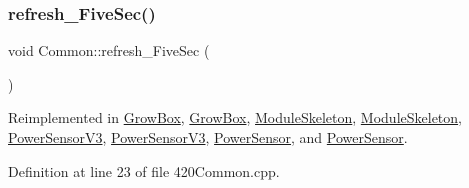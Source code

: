 \mbox{\label{class_common_a604ab36b3a1d9a5bcfcb225149c82f90}} 
\subsubsection{\texorpdfstring{refresh\+\_\+\+Five\+Sec()}{refresh\_FiveSec()}\hspace{0.1cm}{\footnotesize\ttfamily [1/2]}}
{\footnotesize\ttfamily void Common\+::refresh\+\_\+\+Five\+Sec (\begin{DoxyParamCaption}{ }\end{DoxyParamCaption})\hspace{0.3cm}{\ttfamily [virtual]}}



Reimplemented in \hyperlink{class_grow_box_ad3c74a1bbf508489f113215d1f4ae43f}{Grow\+Box}, \hyperlink{class_grow_box_ad3c74a1bbf508489f113215d1f4ae43f}{Grow\+Box}, \hyperlink{class_module_skeleton_a5c9845eec6ca7fbaac1521f4b021712a}{Module\+Skeleton}, \hyperlink{class_module_skeleton_a5c9845eec6ca7fbaac1521f4b021712a}{Module\+Skeleton}, \hyperlink{class_power_sensor_v3_a1bf23a2cfa924933a5e265dc3a337ec4}{Power\+Sensor\+V3}, \hyperlink{class_power_sensor_v3_a1bf23a2cfa924933a5e265dc3a337ec4}{Power\+Sensor\+V3}, \hyperlink{class_power_sensor_a429859d5aa4b72bac2002cda95ac5b21}{Power\+Sensor}, and \hyperlink{class_power_sensor_a429859d5aa4b72bac2002cda95ac5b21}{Power\+Sensor}.



Definition at line 23 of file 420\+Common.\+cpp.

